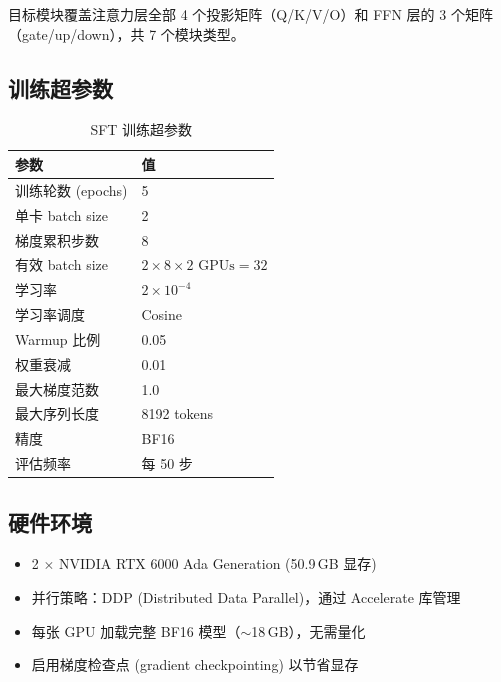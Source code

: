 \documentclass[12pt, a4paper]{article}
\begin{document}
\noindent
目标模块覆盖注意力层全部 4 个投影矩阵（Q/K/V/O）和 FFN 层的 3 个矩阵（gate/up/down），共 7 个模块类型。

\subsection{训练超参数}

\begin{table}[H]
\centering
\caption{SFT 训练超参数}
\label{tab:sft-config}
\small
\begin{tabular}{ll}
\toprule
\textbf{参数} & \textbf{值} \\
\midrule
训练轮数 (epochs)              & 5 \\
单卡 batch size                & 2 \\
梯度累积步数                   & 8 \\
有效 batch size                & $2 \times 8 \times 2\text{ GPUs} = 32$ \\
学习率                         & $2 \times 10^{-4}$ \\
学习率调度                     & Cosine \\
Warmup 比例                    & 0.05 \\
权重衰减                       & 0.01 \\
最大梯度范数                   & 1.0 \\
最大序列长度                   & 8192 tokens \\
精度                           & BF16 \\
评估频率                       & 每 50 步 \\
\bottomrule
\end{tabular}
\end{table}

\subsection{硬件环境}

\begin{itemize}
  \item 2 $\times$ NVIDIA RTX 6000 Ada Generation (50.9\,GB 显存)
  \item 并行策略：DDP (Distributed Data Parallel)，通过 Accelerate 库管理
  \item 每张 GPU 加载完整 BF16 模型（$\sim$18\,GB），无需量化
  \item 启用梯度检查点 (gradient checkpointing) 以节省显存
\end{itemize}
\end{document}
